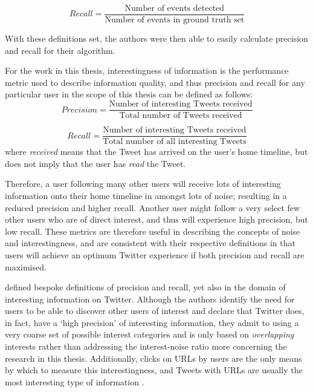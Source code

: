 \[
	Recall = \frac{\text{Number of events detected}}{\text{Number of events in ground truth set}}
\]

With these definitions set, the authors were then able to easily calculate precision and recall for their algorithm.

For the work in this thesis, interestingness of information is the performance metric used to describe information quality, and thus precision and recall for any particular user in the scope of this thesis can be defined as follows:
\[
	Precision = \frac{\text{Number of interesting Tweets received}}{\text{Total number of Tweets received}}
\]

\[
	Recall = \frac{\text{Number of interesting Tweets received}}{\text{Total number of all interesting Tweets}}
\]
where \textit{received} means that the Tweet has arrived on the user's home timeline, but does not imply that the user has \textit{read} the Tweet.

Therefore, a user following many other users will receive lots of interesting information onto their home timeline in amongst lots of noise; resulting in a reduced precision and higher recall. Another user might follow a very select few other users who are of direct interest, and thus will experience high precision, but low recall. These metrics are therefore useful in describing the concepts of noise and interestingness, and are consistent with their respective definitions in that users will achieve an optimum Twitter experience if both precision and recall are maximised.

\citet{zadeh13} defined bespoke definitions of precision and recall, yet also in the domain of interesting information on Twitter. Although the authors identify the need for users to be able to discover other users of interest and declare that Twitter does, in fact, have a `high precision' of interesting information, they admit to using a very coarse set of possible interest categories and is only based on \textit{overlapping} interests rather than addressing the interest-noise ratio more concerning the research in this thesis. Additionally, clicks on URLs by users are the only means by which to measure this interestingness, and Tweets with URLs are usually the most interesting type of information \cite{alonso10}.



